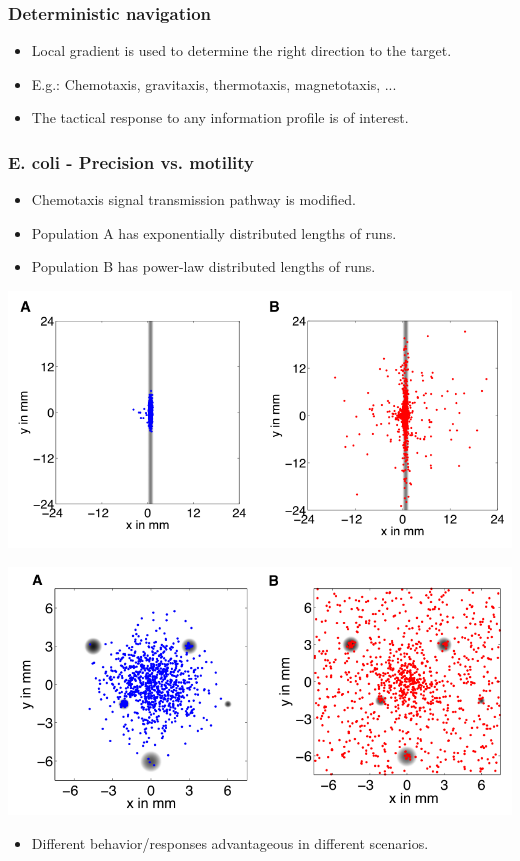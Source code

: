 \documentclass[11pt]{beamer}
\begin{document}
\begin{frame}
 \frametitle{Deterministic navigation}
 
 \begin{itemize}
  \item Local gradient is used to determine the right direction to the target.
  \item E.g.: Chemotaxis, gravitaxis, thermotaxis, magnetotaxis, ...
  \item The tactical response to any information profile is of interest.
 \end{itemize}

\end{frame}


\begin{frame}
 \frametitle{E. coli - Precision vs. motility}
 
 \begin{itemize}
  \item Chemotaxis signal transmission pathway is modified.
  \item Population A has exponentially distributed lengths of runs.
  \item Population B has power-law distributed lengths of runs.
 \end{itemize}

 
 \begin{minipage}[h]{0.49\textwidth}
  \centering
  \includegraphics[width=\textwidth]{gfx/trapez.png}
 \end{minipage}
  \begin{minipage}[h]{0.49\textwidth}
  \centering
  \includegraphics[width=\textwidth]{gfx/dots.png}
 \end{minipage}
 \begin{itemize}
  \item Different behavior/responses advantageous in different scenarios.
 \end{itemize}


\end{frame}
\end{document}
